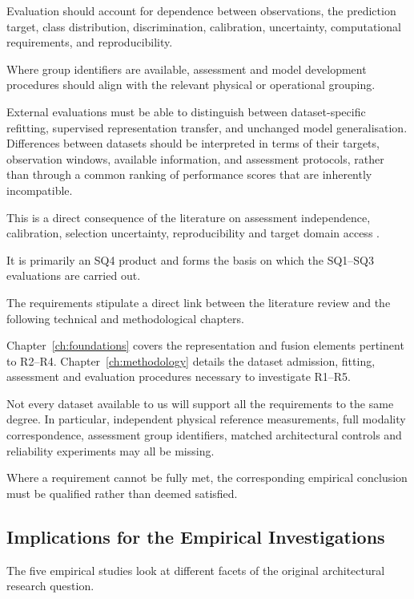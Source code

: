 Evaluation should account for dependence between observations, the prediction target, class
distribution, discrimination, calibration, uncertainty, computational requirements, and
reproducibility.

Where group identifiers are available, assessment and model development procedures should align with
the relevant physical or operational grouping.

External evaluations must be able to distinguish between dataset-specific refitting, supervised
representation transfer, and unchanged model generalisation. Differences between datasets should be
interpreted in terms of their targets, observation windows, available information, and assessment
protocols, rather than through a common ranking of performance scores that are inherently
incompatible.

This is a direct consequence of the literature on assessment independence, calibration, selection
uncertainty, reproducibility and target domain access
\parencite{P004,P017,Guo2017Calibration,P008,Bengio2004CVVariance,P009}.

It is primarily an SQ4 product and forms the basis on which the SQ1--SQ3 evaluations are carried
out.

The requirements stipulate a direct link between the literature review and the following technical
and methodological chapters.

Chapter~\ref{ch:foundations} covers the representation and fusion elements pertinent to R2--R4.
Chapter~\ref{ch:methodology} details the dataset admission, fitting, assessment and evaluation
procedures necessary to investigate R1--R5.

Not every dataset available to us will support all the requirements to the same degree. In
particular, independent physical reference measurements, full modality correspondence, assessment
group identifiers, matched architectural controls and reliability experiments may all be missing.

Where a requirement cannot be fully met, the corresponding empirical conclusion must be qualified
rather than deemed satisfied.

\subsection{Implications for the Empirical Investigations}

\label{sec:literature-study-gaps}

The five empirical studies look at different facets of the original architectural research question.

